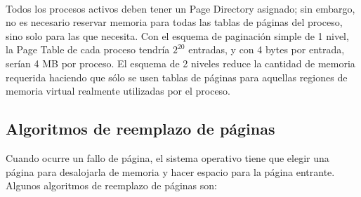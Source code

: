 ~\\

Todos los procesos activos deben tener un Page Directory asignado; sin embargo, no es necesario reservar memoria para todas las tablas de páginas del proceso, sino solo para las que necesita. Con el esquema de paginación simple de 1 nivel, la Page Table de cada proceso tendría $2^{20}$ entradas, y con 4 bytes por entrada, serían 4 MB por proceso. El esquema de 2 niveles reduce la cantidad de memoria requerida haciendo que sólo se usen tablas de páginas para aquellas regiones de memoria virtual realmente utilizadas por el proceso.

\subsection{Algoritmos de reemplazo de páginas}

Cuando ocurre un fallo de página, el sistema operativo tiene que elegir una página para desalojarla de memoria y hacer espacio para la página entrante. Algunos algoritmos de reemplazo de páginas son:


